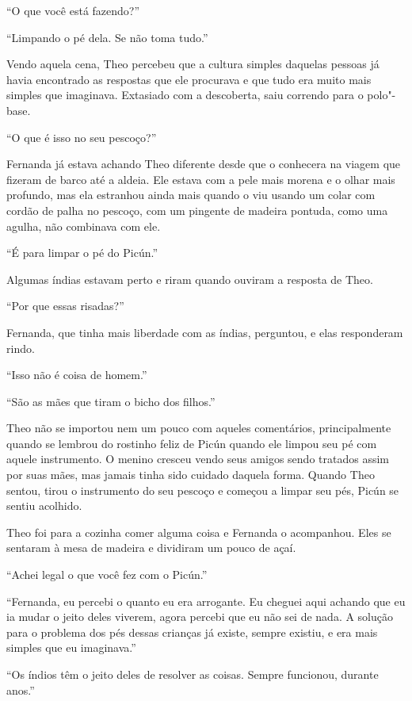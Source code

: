 ``O que você está fazendo?''

``Limpando o pé dela. Se não toma tudo.''

Vendo aquela cena, Theo percebeu
que a cultura simples daquelas pessoas já havia encontrado as respostas
que ele procurava e que tudo era muito mais simples que imaginava.
Extasiado com a descoberta, saiu correndo para o polo"-base.

\asterisc


``O que é isso no seu pescoço?''

Fernanda já estava achando Theo diferente desde que o conhecera na
viagem que fizeram de barco até a aldeia. Ele estava com a pele mais
morena e o olhar mais profundo, mas ela estranhou ainda mais quando o
viu usando um colar com cordão de palha no pescoço, com um pingente de
madeira pontuda, como uma agulha, não combinava com ele.

``É para limpar o pé do Picún.''

Algumas índias estavam perto e riram quando ouviram a resposta de Theo.

``Por que essas risadas?''

Fernanda, que tinha mais liberdade com as índias, perguntou, e elas
responderam rindo.

``Isso não é coisa de homem.''

``São as mães que tiram o bicho dos filhos.''

Theo não se importou nem um pouco com
aqueles comentários, principalmente quando se lembrou do rostinho feliz
de Picún quando ele limpou seu pé com aquele instrumento. O menino
cresceu vendo seus amigos sendo tratados assim por suas mães, mas jamais
tinha sido cuidado daquela forma. Quando Theo sentou, tirou o
instrumento do seu pescoço e começou a limpar seu pés, Picún se sentiu
acolhido.

Theo foi para a cozinha comer alguma coisa e Fernanda o acompanhou. Eles
se sentaram à mesa de madeira e dividiram um pouco de açaí.

``Achei legal o que você fez com o Picún.''

``Fernanda, eu percebi o quanto eu era arrogante. Eu cheguei aqui
achando que eu ia mudar o jeito deles viverem, agora percebi que eu não
sei de nada. A solução para o problema dos pés dessas crianças já
existe, sempre existiu, e era mais simples que eu imaginava.''

``Os índios têm o jeito deles de resolver as coisas. Sempre funcionou,
durante anos.''

